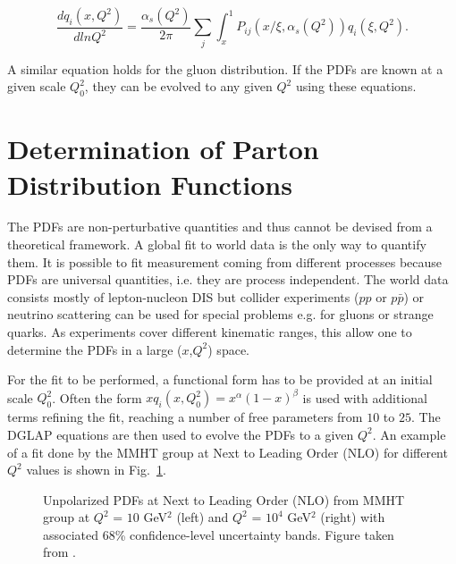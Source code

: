 \begin{equation}
  \frac{dq_i(x,Q^2)}{dlnQ^2} = \frac{\alpha_s(Q^2)}{2\pi}\sum\limits_{j}\int_{x}^{1}P_{ij}(x/\xi,\alpha_s(Q^2))q_i(\xi,Q^2).
\end{equation}

A similar equation holds for the gluon distribution. If the PDFs are known at a given scale $Q_0^2$, they can be evolved to any given $Q^2$ using these equations.


\section{Determination of Parton Distribution Functions}

The PDFs are non-perturbative quantities and thus cannot be devised from a theoretical framework. A global fit to world data is the only way to quantify them. It is possible to fit measurement coming from different processes because PDFs are universal quantities, i.e. they are process independent. The world data consists mostly of lepton-nucleon DIS but collider experiments ($pp$ or $p\bar{p}$) or neutrino scattering can be used for special problems e.g. for gluons or strange quarks. As experiments cover different kinematic ranges, this allow one to determine the PDFs in a large ($x$,$Q^2$) space.

For the fit to be performed, a functional form has to be provided at an initial scale $Q^2_0$. Often the form $xq_i(x,Q^2_0) = x^{\alpha}(1-x)^{\beta}$ is used with additional terms refining the fit, reaching a number of free parameters from $10$ to $25$. The DGLAP equations are then used to evolve the PDFs to a given $Q^2$. An example of a fit done by the MMHT group at Next to Leading Order (NLO) for different $Q^2$ values is shown in Fig.~\ref{fig:MMHT}.

\begin{figure}[htb!]
\centerline{}
\caption{Unpolarized PDFs at Next to Leading Order (NLO) from MMHT group at $Q^2$ = $10$ GeV$^2$ (left) and $Q^2$ = $10^4$ GeV$^2$ (right) with associated 68\% confidence-level uncertainty bands. Figure taken from \cite{MMHT}.}\label{fig:MMHT}
\end{figure}


